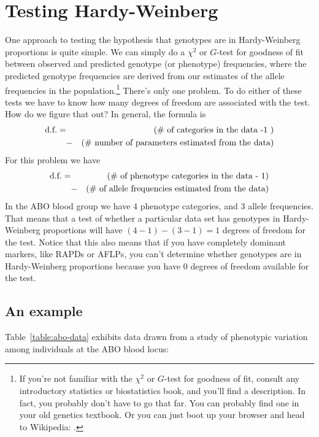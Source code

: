 \documentclass[12pt]{article}
\begin{document}
\section*{Testing Hardy-Weinberg}

One approach to testing the hypothesis that genotypes are in
Hardy-Weinberg proportions is quite simple. We can simply do a
$\chi^2$ or $G$-test for goodness of fit between observed and
predicted genotype (or phenotype) frequencies, where the predicted
genotype frequencies are derived from our estimates of the allele
frequencies in the population.\footnote{If you're not familiar with
  the $\chi^2$ or $G$-test for goodness of fit, consult any
  introductory statistics or biostatistics book, and you'll find a
  description. In fact, you probably don't have to go that far. You
  can probably find one in your old genetics textbook. Or you can just
  boot up your browser and head to Wikipedia:
  . } There's only one problem. To do
either of these tests we have to know how many degrees of freedom are
associated with the test. How do we figure that out? In general, the
formula is
\begin{eqnarray*}
\hbox{d.f.} = && (\hbox{\# of categories in the data -1 }) \\ 
&-& (\hbox{\#
              number of parameters estimated from the data})
\end{eqnarray*}
For this problem we have
\begin{eqnarray*}
\hbox{d.f.} = && (\hbox{\# of phenotype categories in the data - 1}) \\
&-& (\hbox{\# of allele frequencies estimated from the data})
\end{eqnarray*}
In the ABO blood group we have 4 phenotype categories, and 3
allele frequencies. That means that a test of whether a particular
data set has genotypes in Hardy-Weinberg proportions will have
$(4-1)-(3-1) = 1$ degrees of freedom for the test. Notice that this
also means that if you have completely dominant markers, like RAPDs or
AFLPs, you can't determine whether genotypes are in Hardy-Weinberg
proportions because you have 0 degrees of freedom available for the
test.

\subsection*{An example}

Table~\ref{table:abo-data} exhibits data drawn from a study of
phenotypic variation among individuals at the ABO blood locus:
\end{document}
